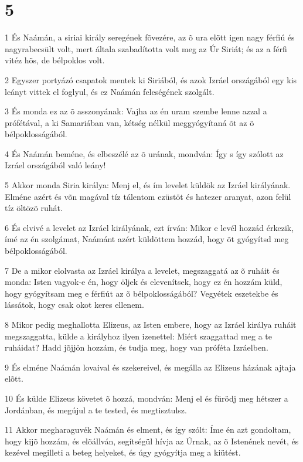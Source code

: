\chapter{5}

\par 1 És Naámán, a siriai király seregének fõvezére, az õ ura elõtt igen nagy férfiú és nagyrabecsült volt, mert általa szabadította volt meg az Úr Siriát; és az a férfi vitéz hõs, de bélpoklos volt.
\par 2 Egyszer portyázó csapatok mentek ki Siriából, és azok Izráel országából egy kis leányt vittek el foglyul, és ez Naámán feleségének szolgált.
\par 3 És monda ez az õ asszonyának: Vajha az én uram szembe lenne azzal a prófétával, a ki Samariában van, kétség nélkül meggyógyítaná õt az õ bélpoklosságából.
\par 4 És Naámán beméne, és elbeszélé az õ urának, mondván: Így s így szólott az Izráel országából való leány!
\par 5 Akkor monda Siria királya: Menj el, és ím levelet küldök az Izráel királyának. Elméne azért és võn magával tíz tálentom ezüstöt és hatezer aranyat, azon felül tíz öltözõ ruhát.
\par 6 És elvivé a levelet az Izráel királyának, ezt írván: Mikor e levél hozzád érkezik, ímé az én szolgámat, Naámánt azért küldöttem hozzád, hogy õt gyógyítsd meg bélpoklosságából.
\par 7 De a mikor elolvasta az Izráel királya a levelet, megszaggatá az õ ruháit és monda: Isten vagyok-e én, hogy öljek és elevenítsek, hogy ez én hozzám küld, hogy gyógyítsam meg e férfiút az õ bélpoklosságából? Vegyétek eszetekbe és lássátok,  hogy csak okot keres ellenem.
\par 8 Mikor pedig meghallotta Elizeus, az Isten embere, hogy az Izráel királya ruháit megszaggatta, külde a királyhoz ilyen izenettel: Miért szaggattad meg a te ruháidat? Hadd jõjjön hozzám, és tudja meg, hogy van próféta Izráelben.
\par 9 És elméne Naámán lovaival és szekereivel, és megálla az Elizeus házának ajtaja elõtt.
\par 10 És külde Elizeus követet õ hozzá, mondván: Menj el és fürödj meg hétszer a Jordánban, és megújul a te tested, és megtisztulsz.
\par 11 Akkor megharaguvék Naámán és elment, és így szólt: Íme én azt gondoltam, hogy kijõ hozzám, és elõállván, segítségül hívja az Úrnak, az õ Istenének nevét, és kezével megilleti a beteg helyeket, és úgy gyógyítja meg a kiütést.
